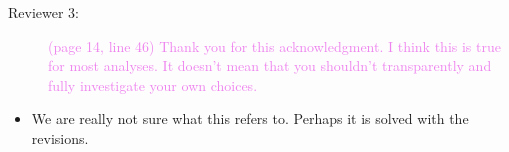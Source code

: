 \documentclass[12pt,a4paper,]{article}
\providecommand{\tightlist}{%
  \setlength{\itemsep}{0pt}\setlength{\parskip}{0pt}}
\begin{document}
\begin{description}
\item[Reviewer 3:]\textcolor{violet}{(page 14, line 46) Thank you for this acknowledgment. I think this is true for most analyses. It doesn’t mean that you shouldn’t transparently and fully investigate your own choices.}
\end{description}

\begin{itemize}
\tightlist
\item
  We are really not sure what this refers to. Perhaps it is solved with the revisions.
\end{itemize}

\printbibliography
\end{document}
